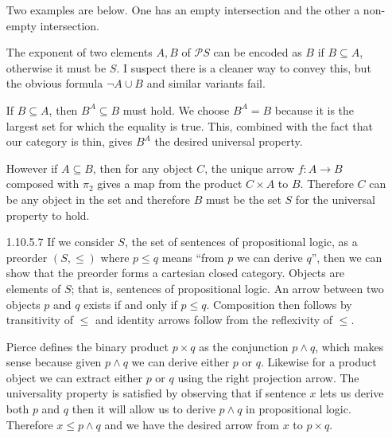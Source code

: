 \documentclass{article}
\newcommand{\id}{\emph{id}}
\newcommand{\powset}{\mathcal{P}}
\newcommand{\set}[1]{\{#1\}}
\begin{document}
\begin{enumerate}
  Two examples are below.
  One has an empty intersection and the other a non-empty intersection.
  \begin{center}
  \end{center}

  The exponent of two elements $A,B$ of $\powset{S}$ can be encoded as $B$ if $B \subseteq A$, otherwise it must be $S$.
  I suspect there is a cleaner way to convey this, but the obvious formula $\neg A \cup B$ and similar variants fail.
  
  If $B \subseteq A$, then $B^A \subseteq B$ must hold.
  We choose $B^A = B$ because it is the largest set for which the equality is true.
  This, combined with the fact that our category is thin, gives $B^A$ the desired universal property.
  
  However if $A \subseteq B$, then for any object $C$, the unique arrow $f : A \rightarrow B$ composed with $\pi_2$ gives a map from the product $C \times A$ to $B$.
  Therefore $C$ can be any object in the set and therefore $B$ must be the set $S$ for the universal property to hold.

\vfill{}
\item [1.10.5.7]
  If we consider $S$, the set of sentences of propositional logic, as a preorder $(S, \le)$ where $p \le q$ means ``from $p$ we can derive $q$'', then we can show that the preorder forms a cartesian closed category.
  Objects are elements of $S$; that is, sentences of propositional logic.
  An arrow between two objects $p$ and $q$ exists if and only if $p \le q$.
  Composition then follows by transitivity of $\le$ and identity arrows follow from the reflexivity of $\le$.

  Pierce defines the binary product $p \times q$ as the conjunction $p \wedge q$, which makes sense because given $p \wedge q$ we can derive either $p$ or $q$.
  Likewise for a product object we can extract either $p$ or $q$ using the right projection arrow.
  The universality property is satisfied by observing that if sentence $x$ lets us derive both $p$ and $q$ then it will allow us to derive $p \wedge q$ in propositional logic.
  Therefore $x \le p \wedge q$ and we have the desired arrow from $x$ to $p \times q$.


\end{enumerate}
\end{document}
